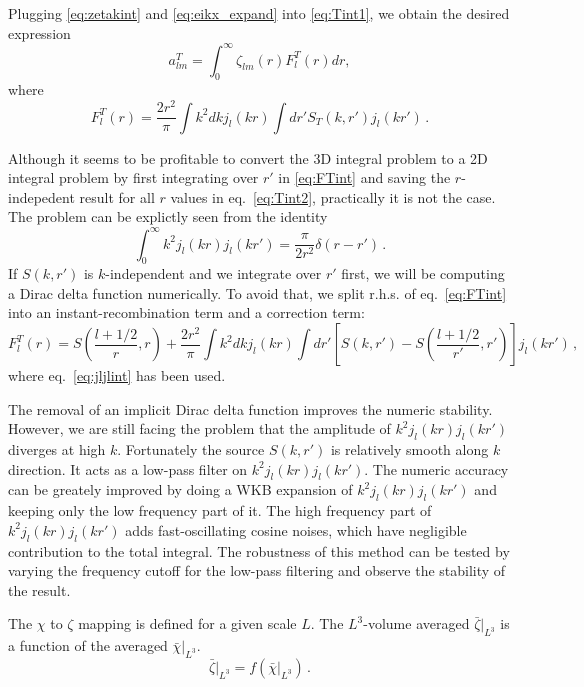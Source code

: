 Plugging \eqref{eq:zetakint} and \eqref{eq:eikx_expand} into \eqref{eq:Tint1}, we obtain the desired expression
\begin{equation}
a_{lm}^T = \int_0^\infty \zeta_{lm}(r) F^T_l(r) dr, \label{eq:Tint2}
\end{equation}
where
\begin{equation}
F^T_l(r) = \frac{2r^2}{\pi} \int k^2dk j_l(kr) \int dr' S_T(k, r') j_l(kr') \, . \label{eq:FTint}
\end{equation}

Although it seems to be profitable to convert the 3D integral problem to a 2D integral problem by first integrating over $r'$ in \eqref{eq:FTint} and saving the $r$-indepedent result for all $r$ values in eq.~\eqref{eq:Tint2}, practically it is not the case. The problem can be explictly seen from the identity
\begin{equation}
\int_0^\infty k^2 j_l(kr) j_l(kr') = \frac{\pi}{2r^2}\delta(r - r') \,. \label{eq:jljlint}
\end{equation}
If $S(k, r')$ is $k$-independent and we integrate over $r'$ first, we will be computing a Dirac delta function numerically. To avoid that, we split r.h.s. of eq.~\eqref{eq:FTint} into an instant-recombination term and a correction term:
\begin{equation}
F^T_l(r) =  S\left(\frac{l+1/2}{r}, r\right) + \frac{2r^2}{\pi} \int k^2dk j_l(kr) \int dr' \left[S(k, r')- S\left(\frac{l+1/2}{r'}, r'\right)\right] j_l(kr') \, , \label{eq:FTint2}
\end{equation}
where eq.~\eqref{eq:jljlint} has been used.

The removal of an implicit Dirac delta function improves the numeric stability. However, we are still facing the problem that the amplitude of $k^2 j_l(kr) j_l(kr')$ diverges at high $k$. Fortunately the source $S(k, r')$ is relatively smooth along $k$ direction. It acts as a low-pass filter on $k^2j_l(kr)j_l(kr')$. The numeric accuracy can be greately improved by doing a WKB expansion of $k^2j_l(kr)j_l(kr')$ and keeping only the low frequency part of it. The high frequency part of $k^2j_l(kr)j_l(kr')$ adds fast-oscillating cosine noises, which have negligible contribution to the total integral. The robustness of this method can be tested by varying the frequency cutoff for the low-pass filtering and observe the stability of the result.

The $\chi$ to $\zeta$ mapping is defined for a given scale $L$. The $L^3$-volume averaged $\bar{\zeta}|_{L^3}$ is a function of the averaged $\bar{\chi}|_{L^3}$.
\begin{equation}
\bar{\zeta}\vert_{L^3}  = f\left(\bar{\chi}\vert_{L^3}\right)\, .
\end{equation}

